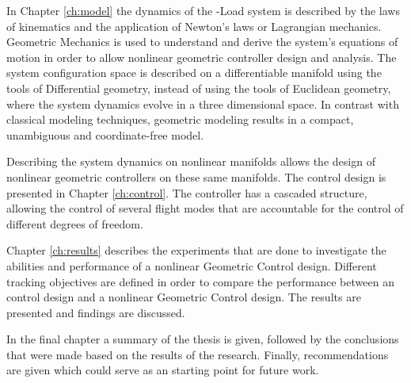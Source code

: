 In Chapter \ref{ch:model} the dynamics of the -Load system is described by the laws of kinematics and the application of Newton's laws or Lagrangian mechanics. 
Geometric Mechanics is used to understand and derive the system's equations of motion in order to allow nonlinear geometric controller design and analysis. 
The system configuration space is described on a differentiable manifold using the tools of Differential geometry, 
instead of using the tools of Euclidean geometry, where the system dynamics evolve in a three dimensional space.
In contrast with classical modeling techniques, geometric modeling results in a compact, unambiguous and coordinate-free model.

Describing the system dynamics on nonlinear manifolds allows the design of nonlinear geometric controllers on these same manifolds. The control design is presented in Chapter \ref{ch:control}. The controller has a cascaded structure, allowing the control of several flight modes that are accountable for the control of different degrees of freedom.

Chapter \ref{ch:results} describes the experiments that are done to investigate the abilities and performance of a nonlinear Geometric Control design. 
Different tracking objectives are defined in order to compare the performance between an  control design and a nonlinear Geometric Control design. 
The results are presented and findings are discussed.

In the final chapter a summary of the thesis is given, followed by the conclusions that were made based on the results of the research.
Finally, recommendations are given which could serve as an starting point for future work. 

